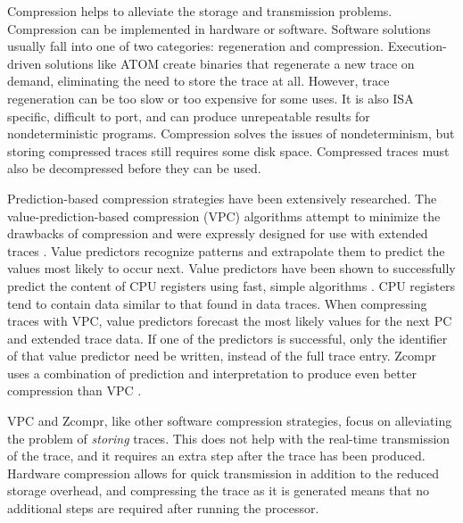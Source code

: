 \documentclass[conference]{IEEEtran}
\begin{document}
Compression helps to alleviate the storage and transmission problems. Compression can be implemented in hardware or software. Software solutions usually fall into one of two categories: regeneration and compression. Execution-driven solutions like ATOM \cite{ATOM} create binaries that regenerate a new trace on demand, eliminating the need to store the trace at all. However, trace regeneration can be too slow or too expensive for some uses. It is also ISA specific, difficult to port, and can produce unrepeatable results for nondeterministic programs. Compression solves the issues of nondeterminism, but storing compressed traces still requires some disk space. Compressed traces must also be decompressed before they can be used.

Prediction-based compression strategies have been extensively researched. The value-prediction-based compression (VPC) algorithms attempt to minimize the drawbacks of compression and were expressly designed for use with extended traces \cite{vpc}. Value predictors recognize patterns and extrapolate them to predict the values most likely to occur next. Value predictors have been shown to successfully predict the content of CPU registers using fast, simple algorithms \cite{burtscher1999} \cite{gabbay1996} \cite{goeman2001} \cite{rychlik1998} \cite{tullsen1999}. CPU registers tend to contain data similar to that found in data traces. When compressing traces with VPC, value predictors forecast the most likely values for the next PC and extended trace data. If one of the predictors is successful, only the identifier of that value predictor need be written, instead of the full trace entry. Zcompr uses a combination of prediction and interpretation to produce even better compression than VPC \cite{kanev2011}.

VPC and Zcompr, like other software compression strategies, focus on alleviating the problem of \emph{storing} traces. This does not help with the real-time transmission of the trace, and it requires an extra step after the trace has been produced. Hardware compression allows for quick transmission in addition to the reduced storage overhead, and compressing the trace as it is generated means that no additional steps are required after running the processor.
\end{document}
